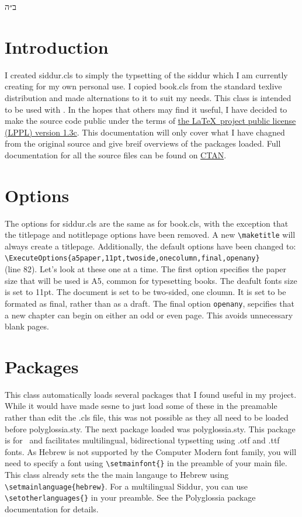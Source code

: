 \documentclass[12pt]{article}
\begin{document}
	\begin{hebrew}\noindent ב״ה\end{hebrew}
	\tableofcontents
	\section{Introduction}
	I created siddur.cls to simply the typsetting of the siddur which I am currently creating for my own personal use. I copied book.cls from the standard texlive distribution and made alternations to it to suit my needs. This class is intended to be used with \XeLaTeX. In the hopes that others may find it useful, I have decided to make the source code public under the terms of \href{https://www.latex-project.org/lppl.txt}{the \LaTeX\ project public license (LPPL) version 1.3c}. This documentation will only cover what I have chagned from the original source and give breif overviews of the packages loaded. Full documentation for all the source files can be found on \href{https://ctan.org/?lang=en}{CTAN}.
	\section{Options}
	The options for siddur.cls are the same as for book.cls, with the exception that the titlepage and notitlepage options have been removed. A new \verb|\maketitle| will always create a titlepage. Additionally, the default options have been changed to:\\\verb|\ExecuteOptions{a5paper,11pt,twoside,onecolumn,final,openany}|\\(line 82). Let's look at these one at a time. The first option specifies the paper size that will be used is A5, common for typesetting books. The deafult fonts size is set to 11pt. The document is set to be two-sided, one cloumn. It is set to be formated as final, rather than as a draft. The final option \verb|openany|, sepcifies that a new chapter can begin on either an odd or even page. This avoids unnecessary blank pages.
	\section{Packages}
	This class automatically loads several packages that I found useful in my project. While it would have made sesne to just load some of these in the preamable rather than edit the .cls file, this was not possible as they all need to be loaded before polyglossia.sty.
	The next package loaded was polyglossia.sty. This package is for \XeLaTeX\ and facilitates multilingual, bidirectional typsetting using .otf and .ttf fonts. As Hebrew is not supported by the Computer Modern font family, you will need to specify a font using \verb|\setmainfont{}| in the preamble of your main file. This class already sets the the main langauge to Hebrew using \verb|\setmainlanguage{hebrew}|. For a multilingual Siddur, you can use \verb|\setotherlanguages{}| in your preamble. See the Polyglossia package documentation for details.
\end{document}
